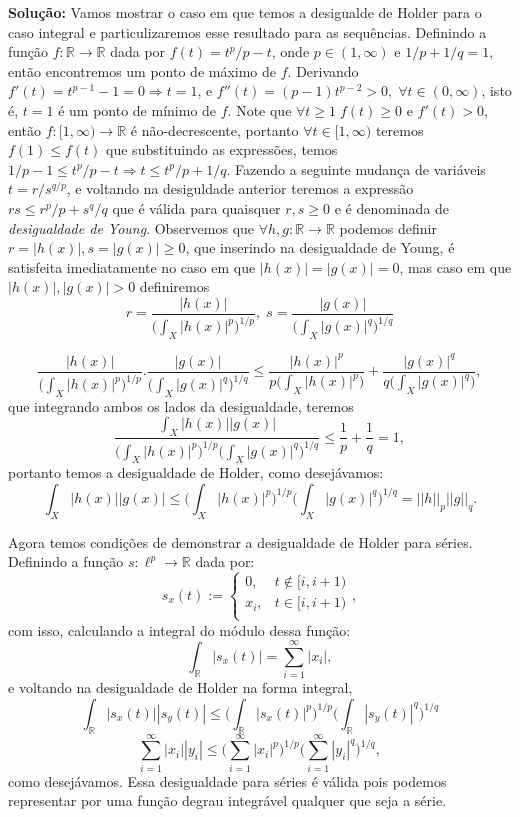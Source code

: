 \documentclass{article}
\begin{document}
\begin{enumerate}
\begin{enumerate}
				\textbf{Solução:} Vamos mostrar o caso em que temos a desigualde de Holder para o caso integral e particulizaremos esse resultado para as sequências. Definindo a função $f:\mathbb{R} \to  \mathbb{R}$ dada por $f(t) = t^{p}/p -t$, onde $p \in (1, \infty)$ e $1/p+1/q=1$, então encontremos um ponto de máximo de $f$. Derivando $f'(t) = t^{p-1} - 1 =0 \Rightarrow t=1$, e $f''(t) = (p-1)t^{p-2} >0, \;\forall t \in (0, \infty)$, isto é, $t=1$ é um ponto de mínimo de $f$. Note que $\forall t \geq 1 \; f(t) \geq 0 $ e $f'(t) >0$, então $f: [1, \infty) \to \mathbb{R}$ é não-decrescente, portanto $\forall t \in [1, \infty)$ teremos $f(1) \leq f(t)$ que substituindo as expressões, temos $1/p - 1\leq  t^{p}/p -t \Rightarrow t \leq t^{p}/p + 1/q$. Fazendo a seguinte mudança de variáveis $t = r/s^{q/p}$, e voltando na desiguldade anterior teremos a expressão $rs \leq r^{p}/p + s^{q}/q$ que é válida para quaisquer $r, s \geq 0$ e é denominada de \textit{desigualdade de Young}. Observemos que $\forall h, g : \mathbb{R} \to \mathbb{R}$ podemos definir $r=|h(x)|, s=|g(x)| \geq 0$, que inserindo na desigualdade de Young, é satisfeita imediatamente no caso em que $|h(x)|=|g(x)| = 0$, mas caso em que $|h(x)|, |g(x)| > 0$ definiremos 
				$$
				r=\frac{|h(x)|}{ \Big (\int_{X}|h(x)|^{p} \Big )^{1/p}}, \; 				s=\frac{|g(x)|}{ \Big (\int_{X}|g(x)|^{q} \Big )^{1/q}}
				$$
				
				$$
				\frac{|h(x)|}{ \Big (\int_{X}|h(x)|^{p} \Big )^{1/p}}. \frac{|g(x)|}{ \Big (\int_{X}|g(x)|^{q} \Big )^{1/q}} \leq \frac{|h(x)|^{p}}{p\Big (\int_{X}|h(x)|^{p} \Big )} + \frac{|g(x)|^{q}}{q\Big (\int_{X}|g(x)|^{q} \Big )},
				$$
				que integrando ambos os lados da desigualdade, teremos
				$$
				\frac{\int_{X}|h(x)||g(x)|}{ \Big (\int_{X}|h(x)|^{p} \Big )^{1/p} \Big (\int_{X}|g(x)|^{q} \Big )^{1/q}} \leq \frac{1}{p} + \frac{1}{q} = 1,
				$$
				portanto temos a desigualdade de Holder, como desejávamos:
				$$
				\int_{X}|h(x)||g(x)|\leq \Big (\int_{X}|h(x)|^{p} \Big )^{1/p}\Big (\int_{X}|g(x)|^{q} \Big )^{1/q} = ||h||_{p}||g||_{q}.
				$$
				
				Agora temos condições de demonstrar a desigualdade de Holder para séries. Definindo a função $s: \ell^{p} \to \mathbb{R}$ dada por:
				$$
				s_{x}(t) := \left\{
				\begin{array}{cc}
				0, & t \notin [i, i+1)\\
				x_{i}, & t \in [i, i+1) \\
				\end{array}
				\right.,
				$$
				com isso, calculando a integral do módulo dessa função:
				$$
				\int_{\mathbb{R}} |s_{x}(t)| = \sum \limits_{i=1}^{\infty} |x_{i}|,
				$$
				e voltando na desigualdade de Holder na forma integral,
				$$
				\int_{\mathbb{R}}|s_{x}(t)||s_{y}(t)| \leq \Big (\int_{\mathbb{R}}|s_{x}(t)|^{p} \Big )^{1/p}\Big (\int_{\mathbb{R}}|s_{y}(t)|^{q} \Big )^{1/q}
				$$
				$$
				\sum \limits_{i=1}^{\infty} |x_{i}||y_{i}| \leq \Big ( \sum \limits_{i=1}^{\infty} |x_{i}|^{p}\Big)^{1/p} \Big ( \sum \limits_{i=1}^{\infty} |y_{i}|^{q}\Big)^{1/q},
				$$
				como desejávamos. Essa desigualdade para séries é válida pois podemos representar por uma função degrau integrável qualquer que seja a série.
				

\end{enumerate}
\end{enumerate}
\end{document}
